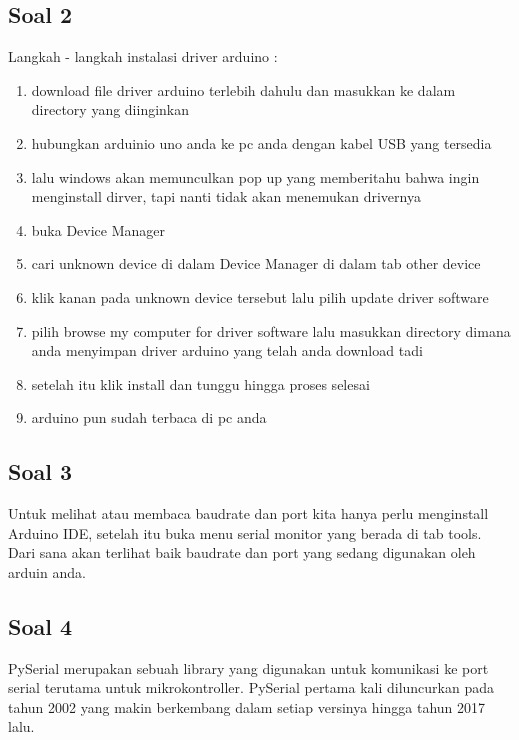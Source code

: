 	\subsection{Soal 2}
	Langkah - langkah instalasi driver arduino :
		\begin{enumerate}
			\item download file driver arduino terlebih dahulu dan masukkan ke dalam directory yang diinginkan
			\item hubungkan arduinio uno anda ke pc anda dengan kabel USB yang tersedia
			\item lalu windows akan memunculkan pop up yang memberitahu bahwa ingin menginstall dirver, tapi nanti tidak akan menemukan drivernya
			\item buka Device Manager 
			\item cari unknown device di dalam Device Manager di dalam tab other device
			\item klik kanan pada unknown device tersebut lalu pilih update driver software
			\item pilih browse my computer for driver software lalu masukkan directory dimana anda menyimpan driver arduino yang telah anda download tadi
			\item setelah itu klik install dan tunggu hingga proses selesai
			\item arduino pun sudah terbaca di pc anda 
		\end{enumerate}

	\subsection{Soal 3}
	Untuk melihat atau membaca baudrate dan port kita hanya perlu menginstall Arduino IDE, setelah itu buka menu serial monitor yang berada di tab tools. Dari sana akan terlihat baik baudrate dan port yang sedang digunakan oleh arduin anda.

	\subsection{Soal 4}
	PySerial merupakan sebuah library yang digunakan untuk komunikasi ke port serial terutama untuk mikrokontroller. PySerial pertama kali diluncurkan pada tahun 2002 yang makin berkembang dalam setiap versinya hingga tahun 2017 lalu.


